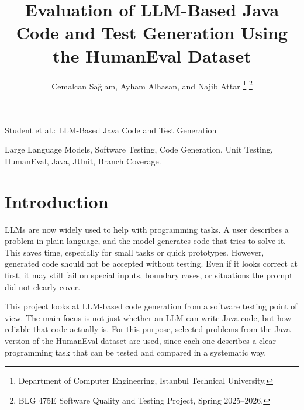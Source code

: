 \documentclass[journal]{IEEEtran}
\begin{document}
\title{Evaluation of LLM-Based Java Code and Test Generation Using the HumanEval Dataset}

\author{
Cemalcan Sağlam, Ayham Alhasan, and Najib Attar%
\thanks{Department of Computer Engineering, Istanbul Technical University.}
\thanks{BLG 475E Software Quality and Testing Project, Spring 2025--2026.}
}

%
{Student et al.: LLM-Based Java Code and Test Generation}

\maketitle

\begin{abstract}
\end{abstract}

\begin{IEEEkeywords}
Large Language Models, Software Testing, Code Generation, Unit Testing, HumanEval, Java, JUnit, Branch Coverage.
\end{IEEEkeywords}


\section{Introduction}
LLMs are now widely used to help with programming tasks. A user describes a problem in plain language, and the model generates code that tries to solve it. This saves time, especially for small tasks or quick prototypes. However, generated code should not be accepted without testing. Even if it looks correct at first, it may still fail on special inputs, boundary cases, or situations the prompt did not clearly cover.

This project looks at LLM-based code generation from a software testing point of view. The main focus is not just whether an LLM can write Java code, but how reliable that code actually is. For this purpose, selected problems from the Java version of the HumanEval dataset are used, since each one describes a clear programming task that can be tested and compared in a systematic way.
\end{document}
